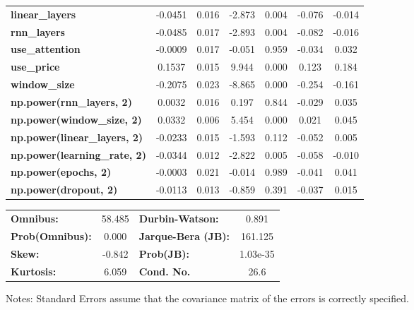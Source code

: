 \begin{center}
\begin{tabular}{lcccccc}
\textbf{linear\_layers}              &      -0.0451  &        0.016     &    -2.873  &         0.004        &       -0.076    &       -0.014     \\
\textbf{rnn\_layers}                 &      -0.0485  &        0.017     &    -2.893  &         0.004        &       -0.082    &       -0.016     \\
\textbf{use\_attention}              &      -0.0009  &        0.017     &    -0.051  &         0.959        &       -0.034    &        0.032     \\
\textbf{use\_price}                  &       0.1537  &        0.015     &     9.944  &         0.000        &        0.123    &        0.184     \\
\textbf{window\_size}                &      -0.2075  &        0.023     &    -8.865  &         0.000        &       -0.254    &       -0.161     \\
\textbf{np.power(rnn\_layers, 2)}    &       0.0032  &        0.016     &     0.197  &         0.844        &       -0.029    &        0.035     \\
\textbf{np.power(window\_size, 2)}   &       0.0332  &        0.006     &     5.454  &         0.000        &        0.021    &        0.045     \\
\textbf{np.power(linear\_layers, 2)} &      -0.0233  &        0.015     &    -1.593  &         0.112        &       -0.052    &        0.005     \\
\textbf{np.power(learning\_rate, 2)} &      -0.0344  &        0.012     &    -2.822  &         0.005        &       -0.058    &       -0.010     \\
\textbf{np.power(epochs, 2)}         &      -0.0003  &        0.021     &    -0.014  &         0.989        &       -0.041    &        0.041     \\
\textbf{np.power(dropout, 2)}        &      -0.0113  &        0.013     &    -0.859  &         0.391        &       -0.037    &        0.015     \\
\bottomrule
\end{tabular}
\begin{tabular}{lclc}
\textbf{Omnibus:}       & 58.485 & \textbf{  Durbin-Watson:     } &    0.891  \\
\textbf{Prob(Omnibus):} &  0.000 & \textbf{  Jarque-Bera (JB):  } &  161.125  \\
\textbf{Skew:}          & -0.842 & \textbf{  Prob(JB):          } & 1.03e-35  \\
\textbf{Kurtosis:}      &  6.059 & \textbf{  Cond. No.          } &     26.6  \\
\bottomrule
\end{tabular}
\end{center}

Notes: \newline
 [1] Standard Errors assume that the covariance matrix of the errors is correctly specified.